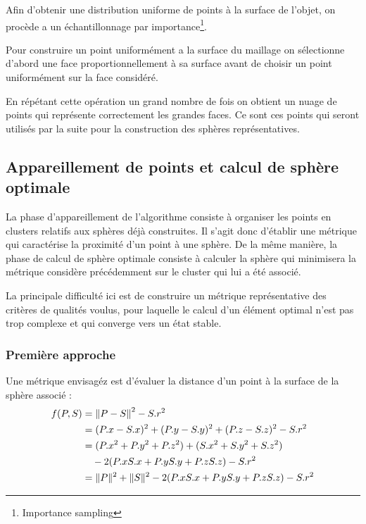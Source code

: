 \documentclass[10pt,a4paper,twoside, twocolumn]{report}
\begin{document}
Afin d'obtenir une distribution uniforme de points à la surface de l'objet, on procède a un échantillonnage par importance\footnote{Importance sampling}.

Pour construire un point uniformément a la surface du maillage on sélectionne d'abord une face proportionnellement à sa surface avant de choisir un point uniformément sur la face considéré.

En répétant cette opération un grand nombre de fois on obtient un nuage de points qui représente correctement les grandes faces. Ce sont ces points qui seront utilisés par la suite pour la construction des sphères représentatives.

\subsection{Appareillement de points et calcul de sphère optimale}

La phase d'appareillement de l'algorithme consiste à organiser les points en clusters relatifs aux sphères déjà construites. Il s’agit donc d’établir une métrique qui caractérise la proximité d'un point à une sphère. De la même manière, la phase de calcul de sphère optimale consiste à calculer la sphère qui minimisera la métrique considère précédemment sur le cluster qui lui a été associé.

La principale difficulté ici est de construire un métrique représentative des critères de qualités voulus, pour laquelle le calcul d'un élément optimal n'est pas trop complexe et qui converge vers un état stable.

\subsubsection{Première approche}

Une métrique envisagéz est d'évaluer la distance d'un point à la surface de la sphère associé :
\begin{align}
	f(P, S) &= \left\|P-S\right\|^2 - S.r^2															\label{eq:metrique}	\\
					&= (P.x-S.x)^2 + (P.y-S.y)^2 + (P.z-S.z)^2 - S.r^2					\notag \\
					&= (P.x^2 + P.y^2+P.z^2) + (S.x^2+S.y^2+S.z^2)							\notag \\
					&\quad - 2(P.xS.x + P.yS.y + P.zS.z)  - S.r^2								\notag \\
					&= \|P\|^2 + \|S\|^2 - 2(P.xS.x + P.yS.y + P.zS.z) - S.r^2	\notag
\end{align}
\end{document}
